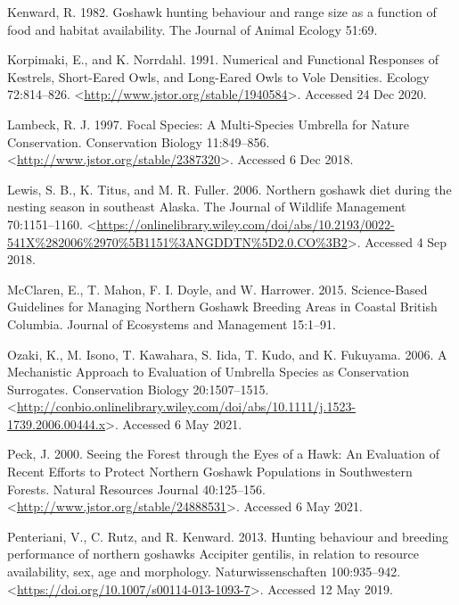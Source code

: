 \documentclass{sfuthesis}
\begin{document}
\leavevmode\hypertarget{ref-kenward_goshawk_1982}{}%
Kenward, R. 1982. Goshawk hunting behaviour and range size as a function of food and habitat availability. The Journal of Animal Ecology 51:69.

\leavevmode\hypertarget{ref-korpimaki_numerical_1991}{}%
Korpimaki, E., and K. Norrdahl. 1991. Numerical and Functional Responses of Kestrels, Short-Eared Owls, and Long-Eared Owls to Vole Densities. Ecology 72:814--826. \textless{}\url{http://www.jstor.org/stable/1940584}\textgreater. Accessed 24 Dec 2020.

\leavevmode\hypertarget{ref-lambeck_focal_1997}{}%
Lambeck, R. J. 1997. Focal Species: A Multi-Species Umbrella for Nature Conservation. Conservation Biology 11:849--856. \textless{}\url{http://www.jstor.org/stable/2387320}\textgreater. Accessed 6 Dec 2018.

\leavevmode\hypertarget{ref-lewis_northern_2006}{}%
Lewis, S. B., K. Titus, and M. R. Fuller. 2006. Northern goshawk diet during the nesting season in southeast Alaska. The Journal of Wildlife Management 70:1151--1160. \textless{}\url{https://onlinelibrary.wiley.com/doi/abs/10.2193/0022-541X\%282006\%2970\%5B1151\%3ANGDDTN\%5D2.0.CO\%3B2}\textgreater. Accessed 4 Sep 2018.

\leavevmode\hypertarget{ref-mcclaren_science-based_2015}{}%
McClaren, E., T. Mahon, F. I. Doyle, and W. Harrower. 2015. Science-Based Guidelines for Managing Northern Goshawk Breeding Areas in Coastal British Columbia. Journal of Ecosystems and Management 15:1--91.

\leavevmode\hypertarget{ref-ozaki_mechanistic_2006}{}%
Ozaki, K., M. Isono, T. Kawahara, S. Iida, T. Kudo, and K. Fukuyama. 2006. A Mechanistic Approach to Evaluation of Umbrella Species as Conservation Surrogates. Conservation Biology 20:1507--1515. \textless{}\url{http://conbio.onlinelibrary.wiley.com/doi/abs/10.1111/j.1523-1739.2006.00444.x}\textgreater. Accessed 6 May 2021.

\leavevmode\hypertarget{ref-peck_seeing_2000}{}%
Peck, J. 2000. Seeing the Forest through the Eyes of a Hawk: An Evaluation of Recent Efforts to Protect Northern Goshawk Populations in Southwestern Forests. Natural Resources Journal 40:125--156. \textless{}\url{http://www.jstor.org/stable/24888531}\textgreater. Accessed 6 May 2021.

\leavevmode\hypertarget{ref-penteriani_hunting_2013}{}%
Penteriani, V., C. Rutz, and R. Kenward. 2013. Hunting behaviour and breeding performance of northern goshawks Accipiter gentilis, in relation to resource availability, sex, age and morphology. Naturwissenschaften 100:935--942. \textless{}\url{https://doi.org/10.1007/s00114-013-1093-7}\textgreater. Accessed 12 May 2019.
\end{document}
